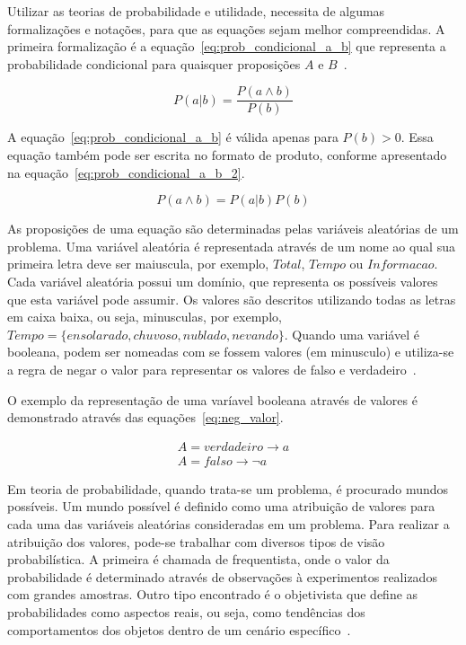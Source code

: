 Utilizar as teorias de probabilidade e utilidade, necessita de algumas formalizações e notações, para que as equações sejam melhor compreendidas. A primeira formalização é a equação~\ref{eq:prob_condicional_a_b} que representa a probabilidade condicional para quaisquer proposições $A$ e $B$~\cite{Russell:2002}.

\begin{equation}
    \label{eq:prob_condicional_a_b}
    P(a|b) = \frac{P(a \land b)}{P(b)}
\end{equation}

A equação~\ref{eq:prob_condicional_a_b} é válida apenas para $P(b) > 0$. Essa equação também pode ser escrita no formato de produto, conforme apresentado na equação~\ref{eq:prob_condicional_a_b_2}.

\begin{equation}
    \label{eq:prob_condicional_a_b_2}
    P(a \land b) = P(a|b)P(b)
\end{equation}

As proposições de uma equação são determinadas pelas variáveis aleatórias de um problema. Uma variável aleatória é representada através de um nome ao qual sua primeira letra deve ser maiuscula, por exemplo, $Total$, $Tempo$ ou $Informacao$. Cada variável aleatória possui um domínio, que representa os possíveis valores que esta variável pode assumir. Os valores são descritos utilizando todas as letras em caixa baixa, ou seja, minusculas, por exemplo, $Tempo = \{ ensolarado, chuvoso, nublado, nevando \}$. Quando uma variável é booleana, podem ser nomeadas com se fossem valores (em minusculo) e utiliza-se a regra de negar o valor para representar os valores de falso e verdadeiro~\cite{Russell:2002}.

O exemplo da representação de uma varíavel booleana através de valores é demonstrado através das equações~\ref{eq:neg_valor}.

\begin{subequations}
    \label{eq:neg_valor}
    \begin{align}
        A = verdadeiro \rightarrow a\\
        A = falso \rightarrow \neg a
    \end{align}
\end{subequations}

Em teoria de probabilidade, quando trata-se um problema, é procurado mundos possíveis. Um mundo possível é definido como uma atribuição de valores para cada uma das variáveis aleatórias consideradas em um problema. Para realizar a atribuição dos valores, pode-se trabalhar com diversos tipos de visão probabilística. A primeira é chamada de frequentista, onde o valor da probabilidade é determinado através de observações à experimentos realizados com grandes amostras. Outro tipo encontrado é o objetivista que define as probabilidades como aspectos reais, ou seja, como tendências dos comportamentos dos objetos dentro de um cenário específico~\cite{Russell:2002}.

